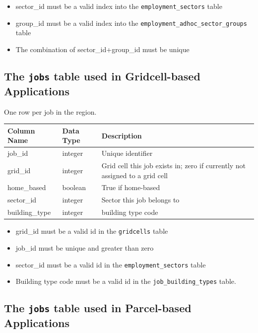 \begin{itemize} \tight
\item sector_id must be a valid index into the \verb|employment_sectors| table
\item group_id must be a valid index into the \verb|employment_adhoc_sector_groups| table
\item The combination of sector_id+group_id must be unique
\end{itemize}

\subsection{The {\tt jobs} table used in Gridcell-based Applications}

One row per job in the region.

\begin{tabular}{lll}
\textbf{Column Name} & \textbf{Data Type} & \textbf{Description} \\
\hline
job_id & integer & Unique identifier  \\
\hline
grid_id & integer & Grid cell this job exists in; zero if currently not assigned to a grid cell  \\
\hline
home_based & boolean & True if home-based  \\\hline
sector_id & integer & Sector this job belongs to  \\\hline
building_type & integer & building type code \\
\hline

\end{tabular}

\begin{itemize} \tight
\item grid_id must be a valid id in the \verb|gridcells| table
\item job_id must be unique and greater than zero
\item sector_id must be a valid id in the \verb|employment_sectors| table
\item Building type code must be a valid id in the \verb|job_building_types| table.
\end{itemize}

\subsection{The {\tt jobs} table used in Parcel-based Applications}

